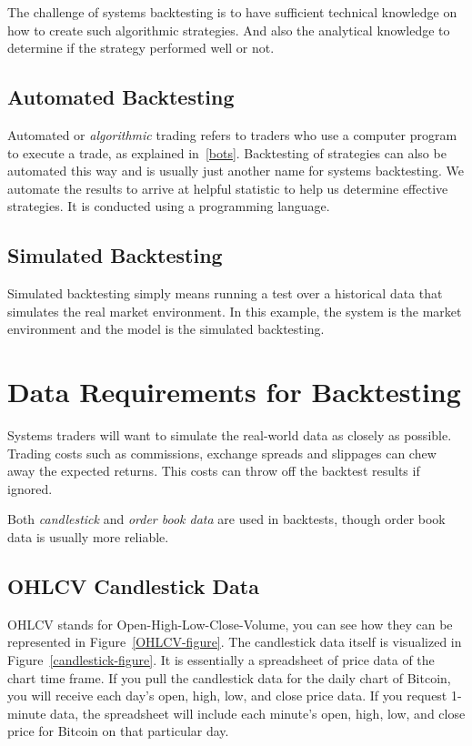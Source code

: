 The challenge of systems backtesting is to have sufficient technical knowledge on how to create such algorithmic strategies. And also the analytical knowledge to determine if the strategy performed well or not.

\subsection*{Automated Backtesting}
Automated or \emph{algorithmic} trading refers to traders who use a computer program to execute a trade, as explained in~\ref{bots}. Backtesting of strategies can also be automated this way and is usually just another name for systems backtesting. We automate the results to arrive at helpful statistic to help us determine effective strategies. It is conducted using a programming language.

\subsection*{Simulated Backtesting}
Simulated backtesting simply means running a test over a historical data that simulates the real market environment. In this example, the system is the market environment and the model is the simulated backtesting.


\section{Data Requirements for Backtesting}
Systems traders will want to simulate the real-world data as closely as possible. Trading costs such as commissions, exchange spreads and slippages can chew away the expected returns. This costs can throw off the backtest results if ignored.

Both \emph{candlestick} and \emph{order book data} are used in backtests, though order book data is usually more reliable.

\subsection*{OHLCV Candlestick Data}
\label{ohlcv-candlestick-data}
OHLCV stands for Open-High-Low-Close-Volume, you can see how they can be represented in Figure~\ref{OHLCV-figure}. The candlestick data itself is visualized in Figure~\ref{candlestick-figure}. It is essentially a spreadsheet of price data of the chart time frame. If you pull the candlestick data for the daily chart of Bitcoin, you will receive each day's open, high, low, and close price data. If you request 1-minute data, the spreadsheet will include each minute's open, high, low, and close price for Bitcoin on that particular day.

